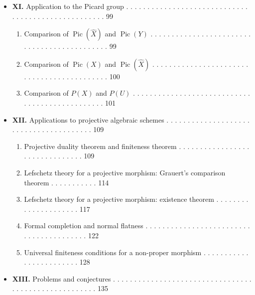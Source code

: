 \documentclass[
  11pt,
  a4paper,
]{book}
\providecommand{\tightlist}{%
  \setlength{\itemsep}{0pt}\setlength{\parskip}{0pt}}
\begin{document}
\begin{itemize}
  \begin{enumerate}
  \def\labelenumi{\arabic{enumi}.}
  \tightlist
  \item
    Comparison of \(\hat{E}t(\hat{X})\) and \(\hat{E}t(Y)\) . . . . . .
    . . . . . . . . . . . . . . . . . . . . . . . . . . . . . . . . . .
    . . . . . . 89
  \item
    Comparison of \(\hat{E}t(Y)\) and \(\hat{E}t(U)\), for \(U\)
    variable . . . . . . . . . . . . . . . . . . . . . . . . . . . . . .
    . . . 89
  \item
    Comparison of \(\pi_{1}(X)\) and \(\pi_{1}(U)\) . . . . . . . . . .
    . . . . . . . . . . . . . . . . . . . . . . . . . . . . . . . . . .
    . . 94
  \end{enumerate}
\item
  \textbf{XI.} Application to the Picard group . . . . . . . . . . . . .
  . . . . . . . . . . . . . . . . . . . . . . . . . . . . . . . . . . .
  . . . 99

  \begin{enumerate}
  \def\labelenumi{\arabic{enumi}.}
  \tightlist
  \item
    Comparison of \(\operatorname{Pic}(\hat{X})\) and
    \(\operatorname{Pic}(Y)\) . . . . . . . . . . . . . . . . . . . . .
    . . . . . . . . . . . . . . . . . . . . . . . 99
  \item
    Comparison of \(\operatorname{Pic}(X)\) and
    \(\operatorname{Pic}(\hat{X})\) . . . . . . . . . . . . . . . . . .
    . . . . . . . . . . . . . . . . . . . . . . . . . 100
  \item
    Comparison of \(P(X)\) and \(P(U)\) . . . . . . . . . . . . . . . .
    . . . . . . . . . . . . . . . . . . . . . . . . . . . . . . . 101
  \end{enumerate}
\item
  \textbf{XII.} Applications to projective algebraic schemes . . . . . .
  . . . . . . . . . . . . . . . . . . . . . . . . . . . . . . . . . 109

  \begin{enumerate}
  \def\labelenumi{\arabic{enumi}.}
  \tightlist
  \item
    Projective duality theorem and finiteness theorem . . . . . . . . .
    . . . . . . . . . . . . . . . . . . . . . . 109
  \item
    Lefschetz theory for a projective morphism: Grauert's comparison
    theorem . . . . . . . . . . . 114
  \item
    Lefschetz theory for a projective morphism: existence theorem . . .
    . . . . . . . . . . . . . . . . . . 117
  \item
    Formal completion and normal flatness . . . . . . . . . . . . . . .
    . . . . . . . . . . . . . . . . . . . . . . . . . 122
  \item
    Universal finiteness conditions for a non-proper morphism . . . . .
    . . . . . . . . . . . . . . . . . . . 128
  \end{enumerate}
\item
  \textbf{XIII.} Problems and conjectures . . . . . . . . . . . . . . .
  . . . . . . . . . . . . . . . . . . . . . . . . . . . . . . . . . . .
  . . . 135


\end{itemize}
\end{document}
